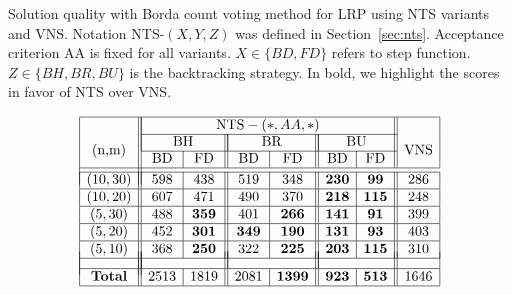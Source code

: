 \documentclass{acm_proc_article-sp}
\begin{document}
\begin{table}[htb!]
\caption{Solution quality with Borda count voting method for LRP using NTS variants and VNS. Notation NTS-$(X,Y,Z)$ was defined in Section~\ref{sec:nts}. Acceptance criterion AA is fixed for all variants. $X\in\{BD,FD\}$ refers to step function. $Z\in \{ BH, BR, BU\}$ is the backtracking strategy. In bold, we highlight the scores in favor of NTS over VNS.}
\label{tab:borda}
\vspace{-3ex}
$$
\begin{array}{|c||c|c||c|c||c|c||c|}
\hline
\multirow{4}{*}{(n,m)} &\multicolumn{6}{|c||}{\textrm{NTS}-(*,AA,*)} & \multirow{4}{*}{\textrm{VNS}}\\
\cline{2-7}
& \multicolumn{2}{|c||}{\textrm{BH}} & \multicolumn{2}{|c||}{\textrm{BR}} & \multicolumn{2}{|c||}{\textrm{BU}} & \\ \cline{2-7}


 & \textrm{BD} & \textrm{FD} & \textrm{BD} & \textrm{FD} & \textrm{BD} & \textrm{FD} &\\ 
 \cline{1-8}
 \\[-9 pt] 
\cline{1-8}

(10,30) & 598 &438 &519 &348 & \mathbf{230} & \mathbf{99} &286 \\ \hline
(10,20) &607 &471 &490 &370 & \mathbf{218} &\mathbf{115} &248 \\ \hline 
(5,30) &488 & \mathbf{359} &401 & \mathbf{266} & \mathbf{141} & \mathbf{91} &399 \\ \hline
(5,20) &452 & \mathbf{301} & \mathbf{349} &\mathbf{190} & \mathbf{131} & \mathbf{93} &403 \\ \hline
(5,10) &368 & \mathbf{250} & 322 & \mathbf{225} & \mathbf{203} & \mathbf{115} &310 \\ \hline\\[-17 pt]
& \multicolumn{2}{|c||}{ } & \multicolumn{2}{|c||}{ } & \multicolumn{2}{|c||}{ } &\\ \hline
\textrm{\textbf{Total}} &2513 &1819 &2081 & \mathbf{1399} & \mathbf{923} & \mathbf{513} &1646\\ \hline
\end{array}
$$
\end{table}
\end{document}
